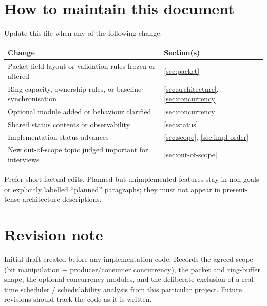 \documentclass[11pt,a4paper]{article}
\begin{document}
\section{How to maintain this document}
\label{sec:doc-maintenance}

Update this file when any of the following change:

\begin{center}
\begin{tabular}{@{}p{}p{}@{}}
\toprule
\textbf{Change} & \textbf{Section(s)} \\
\midrule
Packet field layout or validation rules frozen or altered & \ref{sec:packet} \\
Ring capacity, ownership rules, or baseline synchronisation & \ref{sec:architecture}, \ref{sec:concurrency} \\
Optional module added or behaviour clarified & \ref{sec:concurrency} \\
Shared status contents or observability & \ref{sec:status} \\
Implementation status advances & \ref{sec:scope}, \ref{sec:impl-order} \\
New out-of-scope topic judged important for interviews & \ref{sec:out-of-scope} \\
\bottomrule
\end{tabular}
\end{center}

Prefer short factual edits.  
Planned but unimplemented features stay in non-goals or explicitly labelled ``planned'' paragraphs; they must not appear in present-tense architecture descriptions.

\section{Revision note}
\label{sec:revision}

Initial draft created before any implementation code.
Records the agreed scope (bit manipulation + producer/consumer concurrency), the packet and ring-buffer shape, the optional concurrency modules, and the deliberate exclusion of a real-time scheduler / schedulability analysis from this particular project.
Future revisions should track the code as it is written.
\end{document}
